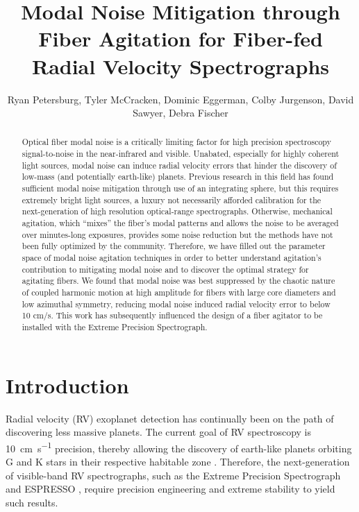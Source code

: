 \documentclass[twocolumn]{emulateapj}
\begin{document}
\title{Modal Noise Mitigation through Fiber Agitation for Fiber-fed Radial Velocity Spectrographs}

\author{Ryan Petersburg, Tyler McCracken, Dominic Eggerman, Colby Jurgenson, David Sawyer, Debra Fischer}

\begin{abstract}

Optical fiber modal noise is a critically limiting factor for high precision spectroscopy signal-to-noise in the near-infrared and visible. Unabated, especially for highly coherent light sources, modal noise can induce radial velocity errors that hinder the discovery of low-mass (and potentially earth-like) planets. Previous research in this field has found sufficient modal noise mitigation through use of an integrating sphere, but this requires extremely bright light sources, a luxury not necessarily afforded calibration for the next-generation of high resolution optical-range spectrographs. Otherwise, mechanical agitation, which ``mixes'' the fiber's modal patterns and allows the noise to be averaged over minutes-long exposures, provides some noise reduction but the methods have not been fully optimized by the community. Therefore, we have filled out the parameter space of modal noise agitation techniques in order to better understand agitation's contribution to mitigating modal noise and to discover the optimal strategy for agitating fibers. We found that modal noise was best suppressed by the chaotic nature of coupled harmonic motion at high amplitude for fibers with large core diameters and low azimuthal symmetry, reducing modal noise induced radial velocity error to below 10 cm/s. This work has subsequently influenced the design of a fiber agitator to be installed with the Extreme Precision Spectrograph.

\end{abstract}


\section{Introduction}
\label{sec:intro}

Radial velocity (RV) exoplanet detection has continually been on the path of discovering less massive planets. The current goal of RV spectroscopy is \SI{10}{\centi\meter\per\second} precision, thereby allowing the discovery of earth-like planets orbiting G and K stars in their respective habitable zone \citep{Fischer2016}. Therefore, the next-generation of visible-band RV spectrographs, such as the Extreme Precision Spectrograph \citep[EXPRES,][]{Jurgenson2016} and ESPRESSO \citet{Megevand2012}, require precision engineering and extreme stability to yield such results.
\end{document}
